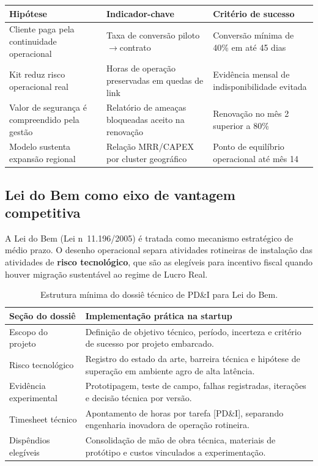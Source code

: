 \begin{quadro}[htb]
\centering
\caption{Hipóteses críticas e indicadores de validação de negócio.}
\label{qua:hipoteses-validacao}
\begin{tabular}{|p{}|p{}|p{}|}
\hline
\textbf{Hipótese} & \textbf{Indicador-chave} & \textbf{Critério de sucesso} \\
\hline
Cliente paga pela continuidade operacional & Taxa de conversão piloto$\rightarrow$contrato & Conversão mínima de 40\% em até 45 dias \\
\hline
Kit reduz risco operacional real & Horas de operação preservadas em quedas de link & Evidência mensal de indisponibilidade evitada \\
\hline
Valor de segurança é compreendido pela gestão & Relatório de ameaças bloqueadas aceito na renovação & Renovação no mês 2 superior a 80\% \\
\hline
Modelo sustenta expansão regional & Relação MRR/CAPEX por cluster geográfico & Ponto de equilíbrio operacional até mês 14 \\
\hline
\end{tabular}
\end{quadro}

\subsection{Lei do Bem como eixo de vantagem competitiva}

A Lei do Bem (Lei n\textordmasculine\ 11.196/2005) é tratada como mecanismo estratégico de médio prazo. O desenho operacional separa atividades rotineiras de instalação das atividades de \textbf{risco tecnológico}, que são as elegíveis para incentivo fiscal quando houver migração sustentável ao regime de Lucro Real.

\begin{table}[htb]
\centering
\caption{Estrutura mínima do dossiê técnico de PD\&I para Lei do Bem.}
\label{tab:dossie-lei-bem}
\begin{tabular}{|p{}|p{}|}
\hline
\textbf{Seção do dossiê} & \textbf{Implementação prática na startup} \\
\hline
Escopo do projeto & Definição de objetivo técnico, período, incerteza e critério de sucesso por projeto embarcado. \\
\hline
Risco tecnológico & Registro do estado da arte, barreira técnica e hipótese de superação em ambiente agro de alta latência. \\
\hline
Evidência experimental & Prototipagem, teste de campo, falhas registradas, iterações e decisão técnica por versão. \\
\hline
Timesheet técnico & Apontamento de horas por tarefa [PD\&I], separando engenharia inovadora de operação rotineira. \\
\hline
Dispêndios elegíveis & Consolidação de mão de obra técnica, materiais de protótipo e custos vinculados a experimentação. \\
\hline
\end{tabular}
\end{table}

